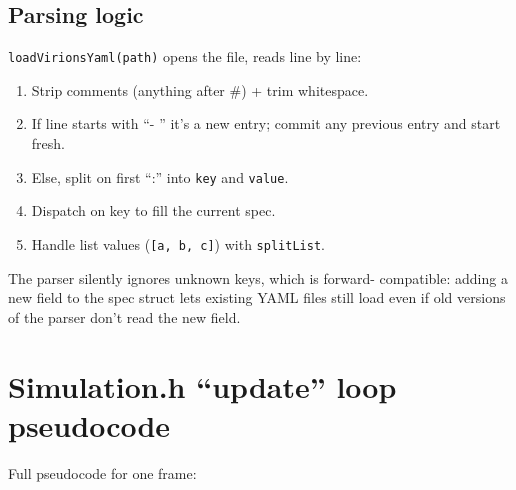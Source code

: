\documentclass[11pt,letterpaper,twoside,openany]{book}
\newcommand{\code}[1]{\texttt{#1}}
\begin{document}
\section{Parsing logic}

\code{loadVirionsYaml(path)} opens the file, reads line by line:
\begin{enumerate}
  \item Strip comments (anything after \#) + trim whitespace.
  \item If line starts with ``- '' it's a new entry; commit any
        previous entry and start fresh.
  \item Else, split on first ``:'' into \code{key} and \code{value}.
  \item Dispatch on key to fill the current spec.
  \item Handle list values (\code{[a, b, c]}) with
        \code{splitList}.
\end{enumerate}

The parser silently ignores unknown keys, which is forward-
compatible: adding a new field to the spec struct lets existing
YAML files still load even if old versions of the parser don't
read the new field.

\chapter{Simulation.h ``update'' loop pseudocode}
\label{ch:update-pseudo}

Full pseudocode for one frame:
\end{document}
